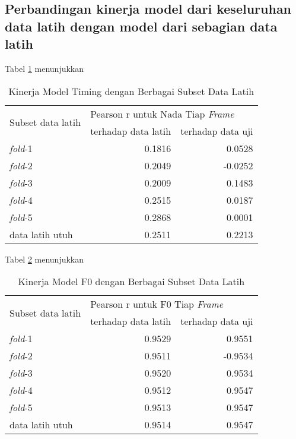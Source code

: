 \subsection{Perbandingan kinerja model dari keseluruhan data latih dengan model dari sebagian data latih}

Tabel \ref{tab-timing-model-subset-results} menunjukkan \blindtext
\begin{table}[h]
    \centering
    \caption{Kinerja Model Timing dengan Berbagai Subset Data Latih}\label{tab-timing-model-subset-results}
    \begin{tabular}{ |l|r|r| } 
     \hline
     \multirow{2}{*}{Subset data latih} & \multicolumn{2}{l|}{Pearson r untuk Nada Tiap \textit{Frame}} \\
     \cline{2-3}
     & terhadap data latih & terhadap data uji \\\hline

	\textit{fold}-1          &0.1816  &0.0528\\\hline
	\textit{fold}-2          &0.2049 &-0.0252\\\hline
	\textit{fold}-3          &0.2009  &0.1483\\\hline
	\textit{fold}-4          &0.2515  &0.0187\\\hline
	\textit{fold}-5          &0.2868  &0.0001\\\hline
	data latih utuh			 &0.2511  &0.2213\\\hline
    \end{tabular}
\end{table}

Tabel \ref{tab-f0-model-subset-results} menunjukkan \blindtext
\begin{table}[h]
    \centering
    \caption{Kinerja Model F0 dengan Berbagai Subset Data Latih}\label{tab-f0-model-subset-results}
    \begin{tabular}{ |l|r|r| } 
     \hline
     \multirow{2}{*}{Subset data latih} & \multicolumn{2}{l|}{Pearson r untuk F0 Tiap \textit{Frame}} \\
     \cline{2-3}
     & terhadap data latih & terhadap data uji \\\hline
	\textit{fold}-1          &0.9529  & 0.9551\\\hline
	\textit{fold}-2          &0.9511  &-0.9534\\\hline
	\textit{fold}-3          &0.9520  &0.9534\\\hline
	\textit{fold}-4          &0.9512  &0.9547\\\hline
	\textit{fold}-5          &0.9513  &0.9547\\\hline
	data latih utuh			 &0.9514  &0.9547\\\hline
    \end{tabular}
\end{table}

